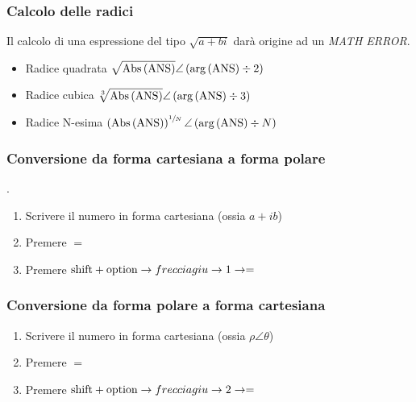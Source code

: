 \documentclass{article}
\begin{document}
\subsubsection{Calcolo delle radici}
Il calcolo di una espressione del tipo \(\sqrt{a+bi}\) darà origine ad un \textit{MATH ERROR}.
\begin{itemize}
	\item Radice quadrata \( \displaystyle \sqrt{ \textnormal{Abs} \left( \textnormal{ANS} \right) } \angle \left( \textnormal{arg} \left( \textnormal{ANS} \right) \div 2 \right) \)
	\item Radice cubica \( \displaystyle \sqrt[3]{ \textnormal{Abs} \left( \textnormal{ANS} \right) } \angle \left( \textnormal{arg} \left( \textnormal{ANS} \right) \div 3 \right) \)
	\item Radice N-esima \(  \left( \textnormal{Abs} \left( \textnormal{ANS} \right) \right) ^ {\sfrac{1}{N}} \angle \left(\textnormal{arg} \left( \textnormal{ANS} \right) \div N \right)\)
\end{itemize}

\subsubsection{Conversione da forma cartesiana a forma polare}.
\begin{enumerate}
	\item Scrivere il numero in forma cartesiana (ossia \(a + ib\))
	\item Premere \(=\)
	\item Premere \(\textnormal{shift} + \textnormal{option} \rightarrow freccia giu \rightarrow 1 \rightarrow = \)
\end{enumerate}

\subsubsection{Conversione da forma polare a forma cartesiana}
\begin{enumerate}
	\item Scrivere il numero in forma cartesiana (ossia \(\rho \angle \theta\))
	\item Premere \(=\)
	\item Premere \(\textnormal{shift} + \textnormal{option} \rightarrow freccia giu \rightarrow 2 \rightarrow = \)
\end{enumerate}

\newpage
\end{document}
